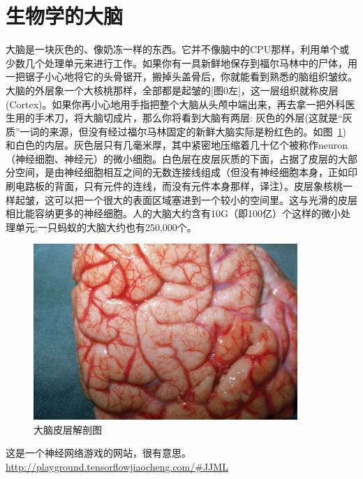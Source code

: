 \section{生物学的大脑}
大脑是一块灰色的、像奶冻一样的东西。它并不像脑中的CPU那样，利用单个或少数几个处理单元来进行工作。如果你有一具新鲜地保存到福尔马林中的尸体，用一把锯子小心地将它的头骨锯开，搬掉头盖骨后，你就能看到熟悉的脑组织皱纹。大脑的外层象一个大核桃那样，全部都是起皱的[图0左]，这一层组织就称皮层(Cortex)。如果你再小心地用手指把整个大脑从头颅中端出来，再去拿一把外科医生用的手术刀，将大脑切成片，那么你将看到大脑有两层: 灰色的外层(这就是“灰质”一词的来源，但没有经过福尔马林固定的新鲜大脑实际是粉红色的。如图~\ref{大脑皮层解剖图}) 和白色的内层。灰色层只有几毫米厚，其中紧密地压缩着几十亿个被称作neuron（神经细胞、神经元）的微小细胞。白色层在皮层灰质的下面，占据了皮层的大部分空间，是由神经细胞相互之间的无数连接线组成（但没有神经细胞本身，正如印刷电路板的背面，只有元件的连线，而没有元件本身那样，译注）。皮层象核桃一样起皱，这可以把一个很大的表面区域塞进到一个较小的空间里。这与光滑的皮层相比能容纳更多的神经细胞。人的大脑大约含有10G（即100亿）个这样的微小处理单元;一只蚂蚁的大脑大约也有250,000个。
\begin{figure}[H]
  \centering
  \includegraphics[width=10cm]{Figures/大脑皮层解剖图.jpg}
  \caption{大脑皮层解剖图}\label{大脑皮层解剖图}
\end{figure}

这是一个神经网络游戏的网站，很有意思。\url{http://playground.tensorflowjiaocheng.com/#JJML}